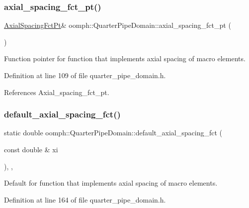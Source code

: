 \subsubsection{\texorpdfstring{axial\+\_\+spacing\+\_\+fct\+\_\+pt()}{axial\_spacing\_fct\_pt()}}
{\footnotesize\ttfamily \hyperlink{classoomph_1_1QuarterPipeDomain_a540d441b38146aacb12938d5f885789c}{Axial\+Spacing\+Fct\+Pt}\& oomph\+::\+Quarter\+Pipe\+Domain\+::axial\+\_\+spacing\+\_\+fct\+\_\+pt (\begin{DoxyParamCaption}{ }\end{DoxyParamCaption})\hspace{0.3cm}{\ttfamily [inline]}}



Function pointer for function that implements axial spacing of macro elements. 



Definition at line 109 of file quarter\+\_\+pipe\+\_\+domain.\+h.



References Axial\+\_\+spacing\+\_\+fct\+\_\+pt.

\mbox{\label{classoomph_1_1QuarterPipeDomain_a3b79d0bf40336f7961a8b2bb58080dba}} 
\subsubsection{\texorpdfstring{default\+\_\+axial\+\_\+spacing\+\_\+fct()}{default\_axial\_spacing\_fct()}}
{\footnotesize\ttfamily static double oomph\+::\+Quarter\+Pipe\+Domain\+::default\+\_\+axial\+\_\+spacing\+\_\+fct (\begin{DoxyParamCaption}\item[{const double \&}]{xi }\end{DoxyParamCaption})\hspace{0.3cm}{\ttfamily [inline]}, {\ttfamily [static]}, {\ttfamily [private]}}



Default for function that implements axial spacing of macro elements. 



Definition at line 164 of file quarter\+\_\+pipe\+\_\+domain.\+h.




